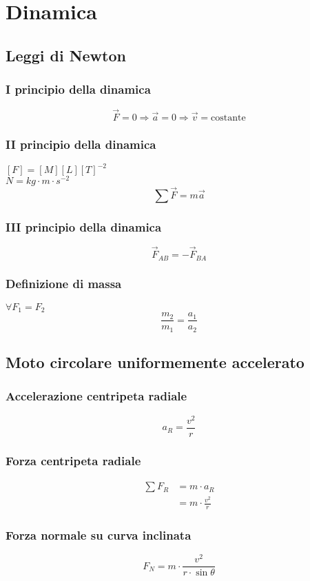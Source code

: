 \documentclass[a4paper,12pt]{article}
\theoremstyle{mystyle}
\begin{document}
\newpage


\section{Dinamica}

\subsection{Leggi di Newton}
\subsubsection{I principio della dinamica}
\[\vec F = 0 \Rightarrow \vec a = 0 \Rightarrow \vec v = \text{costante}\]
\subsubsection{II principio della dinamica}
\([F]=[M][L][T]^{-2}\)\\
\(N=kg \cdot m \cdot s^{-2}\)\\
\[\sum \vec F = m \vec a\]
\subsubsection{III principio della dinamica}
\[\vec F_{AB} = - \vec F_{BA}\]
\subsubsection{Definizione di massa}
\(\forall F_1=F_2\)\\
\[\frac{m_2}{m_1}=\frac{a_1}{a_2}\]

\newpage

\subsection{Moto circolare uniformemente accelerato}
\subsubsection{Accelerazione centripeta radiale}
\[a_R = \frac{v^2}{r}\]
\subsubsection{Forza centripeta radiale}
\[\begin{aligned}
    \sum F_R &= m \cdot a_R\\
    &= m \cdot \frac{v^2}{r}
\end{aligned}\]
\subsubsection{Forza normale su curva inclinata}
\[F_N = m \cdot \frac{v^2}{r \cdot \sin \theta}\]
\end{document}

